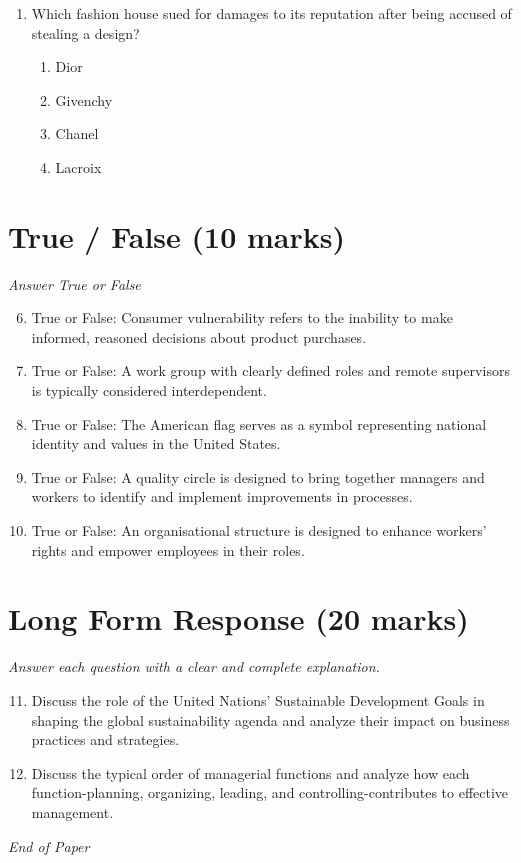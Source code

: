 \documentclass[12pt]{article}
\begin{document}
\begin{enumerate}[label=\arabic*.]
\begin{enumerate}[label=(\alph*)]
    \item Person-oriented
    \item Idea-oriented
    \item Message-oriented
\end{enumerate}
\item Which fashion house sued for damages to its reputation after being accused of stealing a design?
\begin{enumerate}[label=(\alph*)]
    \item Dior
    \item Givenchy
    \item Chanel
    \item Lacroix
\end{enumerate}
\end{enumerate}

\section*{True / False (10 marks)}
\textit{Answer True or False}
\begin{enumerate}[label=\arabic*.]
\setcounter{enumi}{5}
\item True or False: Consumer vulnerability refers to the inability to make informed, reasoned decisions about product purchases.
\item True or False: A work group with clearly defined roles and remote supervisors is typically considered interdependent.
\item True or False: The American flag serves as a symbol representing national identity and values in the United States.
\item True or False: A quality circle is designed to bring together managers and workers to identify and implement improvements in processes.
\item True or False: An organisational structure is designed to enhance workers' rights and empower employees in their roles.
\end{enumerate}

\section*{Long Form Response (20 marks)}
\textit{Answer each question with a clear and complete explanation.}
\begin{enumerate}[label=\arabic*.]
\setcounter{enumi}{10}
\item Discuss the role of the United Nations' Sustainable Development Goals in shaping the global sustainability agenda and analyze their impact on business practices and strategies.
\item Discuss the typical order of managerial functions and analyze how each function-planning, organizing, leading, and controlling-contributes to effective management.
\end{enumerate}

\vfill
\noindent\textit{End of Paper}
\end{document}
